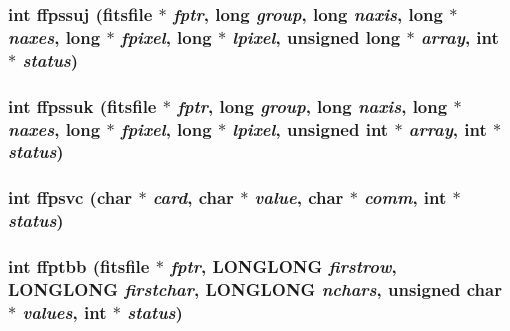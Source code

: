 \subsubsection{\setlength{\rightskip}{0pt plus 5cm}int ffpssuj (\bf{fitsfile} $\ast$ {\em fptr}, long {\em group}, long {\em naxis}, long $\ast$ {\em naxes}, long $\ast$ {\em fpixel}, long $\ast$ {\em lpixel}, unsigned long $\ast$ {\em array}, int $\ast$ {\em status})}\label{test_2roimasker_2fitsio_8h_59750e86feb6356e01a6ce684dad31d1}


\subsubsection{\setlength{\rightskip}{0pt plus 5cm}int ffpssuk (\bf{fitsfile} $\ast$ {\em fptr}, long {\em group}, long {\em naxis}, long $\ast$ {\em naxes}, long $\ast$ {\em fpixel}, long $\ast$ {\em lpixel}, unsigned int $\ast$ {\em array}, int $\ast$ {\em status})}\label{test_2roimasker_2fitsio_8h_6211df3aa144d88cda8fd8fe8eade594}


\subsubsection{\setlength{\rightskip}{0pt plus 5cm}int ffpsvc (char $\ast$ {\em card}, char $\ast$ {\em value}, char $\ast$ {\em comm}, int $\ast$ {\em status})}\label{test_2roimasker_2fitsio_8h_9a1a8933359feb3576cc14a1e5c671c5}


\subsubsection{\setlength{\rightskip}{0pt plus 5cm}int ffptbb (\bf{fitsfile} $\ast$ {\em fptr}, \bf{LONGLONG} {\em firstrow}, \bf{LONGLONG} {\em firstchar}, \bf{LONGLONG} {\em nchars}, unsigned char $\ast$ {\em values}, int $\ast$ {\em status})}\label{test_2roimasker_2fitsio_8h_8154f91f7c90d22f49af94d61d443036}


